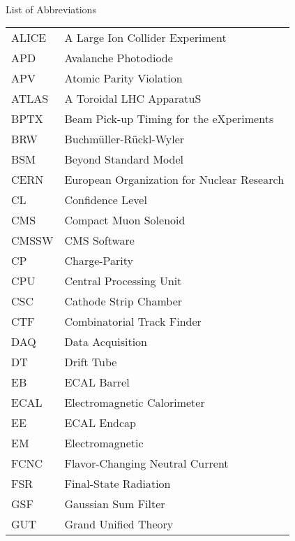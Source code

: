 
\renewcommand{\baselinestretch}{1}
\small\normalsize
\hbox{\ }

\vspace{-4em}

\begin{center}
\large{List of Abbreviations}
\end{center} 

\vspace{3pt}

\begin{supertabular}[l]{@{}l@{\ \ \ \ \ \ \ \ \ \ \ \ }l}
ALICE      & A Large Ion Collider Experiment \\
APD        & Avalanche Photodiode \\
APV        & Atomic Parity Violation \\
ATLAS      & A Toroidal LHC ApparatuS \\
BPTX       & Beam Pick-up Timing for the eXperiments \\
BRW        & Buchm\"{u}ller-R\"{u}ckl-Wyler \\
BSM        & Beyond Standard Model \\
CERN       & European Organization for Nuclear Research \\
CL         & Confidence Level \\
CMS        & Compact Muon Solenoid \\
CMSSW      & CMS Software \\
CP         & Charge-Parity \\
CPU        & Central Processing Unit \\
CSC        & Cathode Strip Chamber \\
CTF        & Combinatorial Track Finder \\
DAQ        & Data Acquisition \\
DT         & Drift Tube \\
EB         & ECAL Barrel \\
ECAL       & Electromagnetic Calorimeter \\
EE         & ECAL Endcap \\
EM         & Electromagnetic \\
FCNC       & Flavor-Changing Neutral Current \\
FSR        & Final-State Radiation \\
GSF        & Gaussian Sum Filter \\
GUT        & Grand Unified Theory \\

\end{supertabular}
